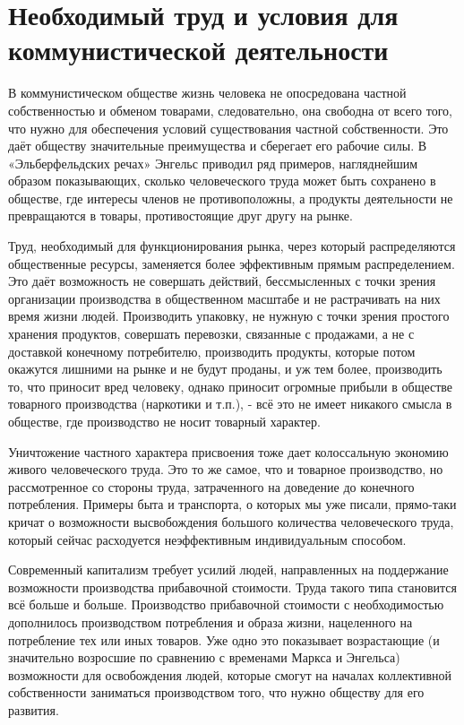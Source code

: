\documentclass[../main]{subfiles}
\begin{document}
\ifSubfilesClassLoaded{\setcounter{page}{36}}{}
\section{Необходимый труд и условия для коммунистической деятельности}
\label{sec:06_necessitatem_truda}

В коммунистическом обществе жизнь человека не опосредована частной собственностью и обменом товарами, следовательно, она свободна от всего того, что нужно для обеспечения условий существования частной собственности. Это даёт обществу значительные преимущества и сберегает его рабочие силы. В «Эльберфельдских речах» Энгельс приводил ряд примеров, нагляднейшим образом показывающих, сколько человеческого труда может быть сохранено в обществе, где интересы членов не противоположны, а продукты деятельности не превращаются в товары, противостоящие друг другу на рынке.

Труд, необходимый для функционирования рынка, через который распределяются общественные ресурсы, заменяется более эффективным прямым распределением. Это даёт возможность не совершать действий, бессмысленных с точки зрения организации производства в общественном масштабе и не растрачивать на них время жизни людей. Производить упаковку, не нужную с точки зрения простого хранения продуктов, совершать перевозки, связанные с продажами, а не с доставкой конечному потребителю, производить продукты, которые потом окажутся лишними на рынке и не будут проданы, и уж тем более, производить то, что приносит вред человеку, однако приносит огромные прибыли в обществе товарного производства (наркотики и т.п.), - всё это не имеет никакого смысла в обществе, где производство не носит товарный характер.

Уничтожение частного характера присвоения тоже дает колоссальную экономию живого человеческого труда. Это то же самое, что и товарное производство, но рассмотренное со стороны труда, затраченного на доведение до конечного потребления. Примеры быта и транспорта, о которых мы уже писали, прямо-таки кричат о возможности высвобождения большого количества человеческого труда, который сейчас расходуется неэффективным индивидуальным способом.

Современный капитализм требует усилий людей, направленных на поддержание возможности производства прибавочной стоимости. Труда такого типа становится всё больше и больше. Производство прибавочной стоимости с необходимостью дополнилось производством потребления и образа жизни, нацеленного на потребление тех или иных товаров. Уже одно это показывает возрастающие (и значительно возросшие по сравнению с временами Маркса и Энгельса) возможности для освобождения людей, которые смогут на началах коллективной собственности заниматься производством того, что нужно обществу для его развития.
\end{document}
